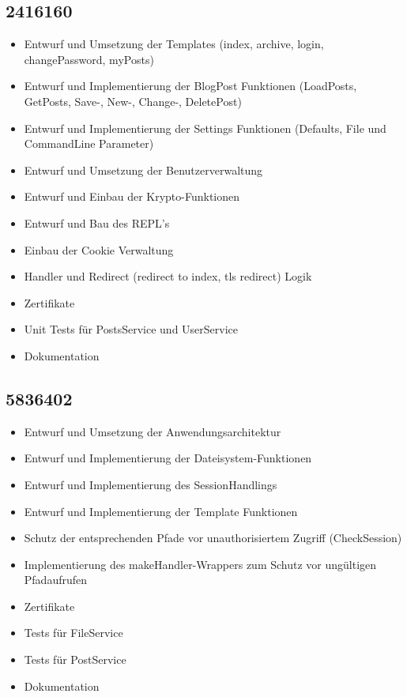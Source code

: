 \documentclass[10pt]{article}
\begin{document}
		\subsection{2416160}
		\begin{itemize}
			\item Entwurf und Umsetzung der Templates (index, archive, login, changePassword, myPosts)
			\item Entwurf und Implementierung der BlogPost Funktionen (LoadPosts, GetPosts, Save-, New-, Change-, DeletePost)
			\item Entwurf und Implementierung der Settings Funktionen (Defaults, File und CommandLine Parameter)
			\item Entwurf und Umsetzung der Benutzerverwaltung
			\item Entwurf und Einbau der Krypto-Funktionen
			\item Entwurf und Bau des REPL's
			\item Einbau der Cookie Verwaltung
			\item Handler und Redirect (redirect to index, tls redirect) Logik
			\item Zertifikate
			\item Unit Tests f\"ur PostsService und UserService
			\item Dokumentation
		\end{itemize}
		\subsection{5836402}
		\begin{itemize}
			\item Entwurf und Umsetzung der Anwendungsarchitektur
			\item Entwurf und Implementierung der Dateisystem-Funktionen
			\item Entwurf und Implementierung des SessionHandlings
			\item Entwurf und Implementierung der Template Funktionen
			\item Schutz der entsprechenden Pfade vor unauthorisiertem Zugriff (CheckSession)
			\item Implementierung des makeHandler-Wrappers zum Schutz vor ungültigen Pfadaufrufen
			\item Zertifikate
			\item Tests für FileService
			\item Tests für PostService
			\item Dokumentation
		\end{itemize}
\end{document}
